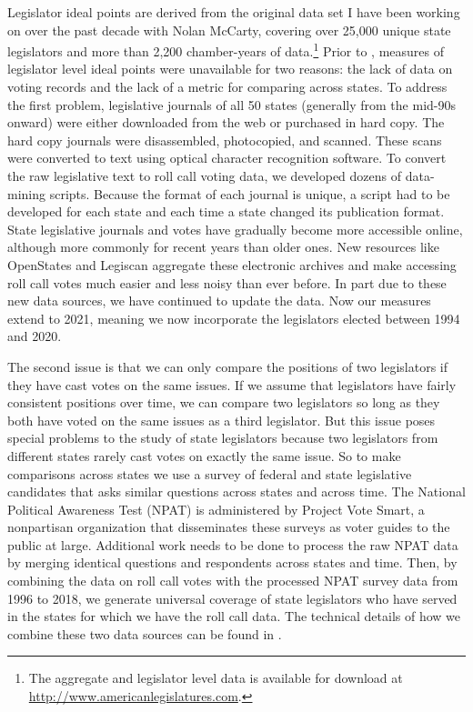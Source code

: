 \documentclass[
  oneside]{book}
\begin{document}
Legislator ideal points are derived from the original data set I have been working on over the past decade with Nolan McCarty, covering over 25,000 unique state legislators and more than 2,200 chamber-years of data.\footnote{The aggregate and legislator level data is available for download at \url{http://www.americanlegislatures.com}.} Prior to \citet{Shor:2011}, measures of legislator level ideal points were unavailable for two reasons: the lack of data on voting records and the lack of a metric for comparing across states. To address the first problem, legislative journals of all 50 states (generally from the mid-90s onward) were either downloaded from the web or purchased in hard copy. The hard copy journals were disassembled, photocopied, and scanned. These scans were converted to text using optical character recognition software. To convert the raw legislative text to roll call voting data, we developed dozens of data-mining scripts. Because the format of each journal is unique, a script had to be developed for each state and each time a state changed its publication format. State legislative journals and votes have gradually become more accessible online, although more commonly for recent years than older ones. New resources like OpenStates and Legiscan aggregate these electronic archives and make accessing roll call votes much easier and less noisy than ever before. In part due to these new data sources, we have continued to update the data. Now our measures extend to 2021, meaning we now incorporate the legislators elected between 1994 and 2020.

The second issue is that we can only compare the positions of two legislators if they have cast votes on the same issues. If we assume that legislators have fairly consistent positions over time, we can compare two legislators so long as they both have voted on the same issues as a third legislator. But this issue poses special problems to the study of state legislators because two legislators from different states rarely cast votes on exactly the same issue. So to make comparisons across states we use a survey of federal and state legislative candidates that asks similar questions across states and across time. The National Political Awareness Test (NPAT) is administered by Project Vote Smart, a nonpartisan organization that disseminates these surveys as voter guides to the public at large. Additional work needs to be done to process the raw NPAT data by merging identical questions and respondents across states and time. Then, by combining the data on roll call votes with the processed NPAT survey data from 1996 to 2018, we generate universal coverage of state legislators who have served in the states for which we have the roll call data. The technical details of how we combine these two data sources can be found in \citet{Shor:2011}.
\end{document}

